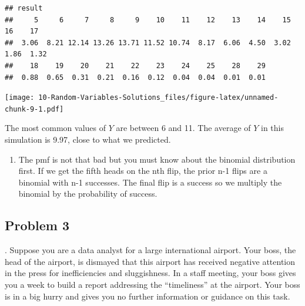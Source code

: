 \documentclass[
]{book}
\newenvironment{Shaded}{\begin{snugshade}}{\end{snugshade}}
\newcommand{\DataTypeTok}[1]{\textcolor[rgb]{0.13,0.29,0.53}{#1}}
\newcommand{\KeywordTok}[1]{\textcolor[rgb]{0.13,0.29,0.53}{\textbf{#1}}}
\newcommand{\NormalTok}[1]{#1}
\newcommand{\OperatorTok}[1]{\textcolor[rgb]{0.81,0.36,0.00}{\textbf{#1}}}
\newcommand{\StringTok}[1]{\textcolor[rgb]{0.31,0.60,0.02}{#1}}
\providecommand{\tightlist}{%
  \setlength{\itemsep}{0pt}\setlength{\parskip}{0pt}}
\begin{document}
\begin{verbatim}
## result
##     5     6     7     8     9    10    11    12    13    14    15    16    17 
##  3.06  8.21 12.14 13.26 13.71 11.52 10.74  8.17  6.06  4.50  3.02  1.86  1.32 
##    18    19    20    21    22    23    24    25    28    29 
##  0.88  0.65  0.31  0.21  0.16  0.12  0.04  0.04  0.01  0.01
\end{verbatim}

\begin{Shaded}
\end{Shaded}

\texttt{[image: 10-Random-Variables-Solutions\_files/figure-latex/unnamed-chunk-9-1.pdf]}

The most common values of \(Y\) are between 6 and 11. The average of \(Y\) in this simulation is 9.97, close to what we predicted.

\begin{enumerate}
\def\labelenumi{\alph{enumi}.}
\setcounter{enumi}{3}
\tightlist
\item
  The pmf is not that bad but you must know about the binomial distribution first. If we get the fifth heads on the nth flip, the prior n-1 flips are a binomial with n-1 successes. The final flip is a success so we multiply the binomial by the probability of success.
\end{enumerate}

\hypertarget{problem-3-6}{%
\subsection{Problem 3}\label{problem-3-6}}

. Suppose you are a data analyst for a large international airport. Your boss, the head of the airport, is dismayed that this airport has received negative attention in the press for inefficiencies and sluggishness. In a staff meeting, your boss gives you a week to build a report addressing the ``timeliness'' at the airport. Your boss is in a big hurry and gives you no further information or guidance on this task.
\end{document}
